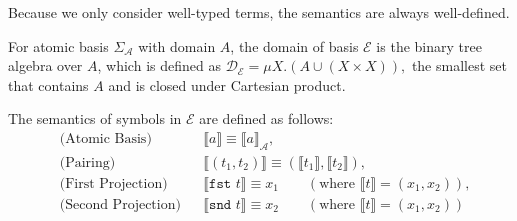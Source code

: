 \documentclass[manuscript, review, timestamp]{acmart}
\newcommand*{\fst}{\texttt{fst }}
\newcommand*{\snd}{\texttt{snd }}
\newcommand*{\sem}[1]{\llbracket #1 \rrbracket}
\begin{document}
Because we only consider well-typed terms, the semantics are always well-defined.


\begin{definition}
  For atomic basis $\Sigma_\mathcal{A}$ with domain $A$, the domain of basis $\mathcal{E}$ is the binary tree algebra over $A$, which is defined as 
  $
  \mathcal{D}_\mathcal{E} = \mu X.(A \cup (X \times X)),
  $
  the smallest set that contains $A$ and is closed under Cartesian product.

  The semantics of symbols in $\mathcal{E}$ are defined as follows:
  \begin{align*}
    & \text{(Atomic Basis)} && \sem{a} \equiv \sem{a}_\mathcal{A}, \\
    & \text{(Pairing)} &&
    \sem{(t_1, t_2)} \equiv (\sem{t_1}, \sem{t_2}), \\
    & \text{(First Projection)} &&
    \sem{\fst t} \equiv x_1 \qquad (\text{where } \sem{t} = (x_1, x_2)), \\
    & \text{(Second Projection)} &&
    \sem{\snd t} \equiv x_2 \qquad (\text{where } \sem{t} = (x_1, x_2))
    \\
  \end{align*}
\end{definition}


\end{document}
